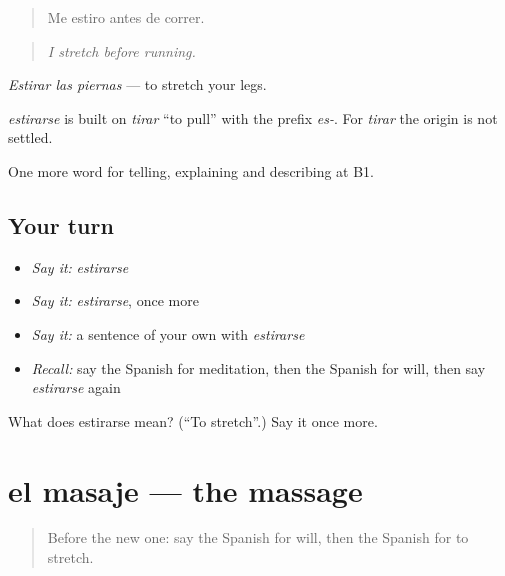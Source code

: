 \begin{quote}
Me estiro antes de correr.
\end{quote}

\begin{quote}
\emph{I stretch before running.}
\end{quote}

\emph{Estirar las piernas} — to stretch your legs.

\begin{cousinweb}
\emph{estirarse} is built on \emph{tirar} \textquotedblleft{}to pull\textquotedblright{} with the prefix \emph{es-}. For \emph{tirar} the origin is not settled.
\end{cousinweb}

\begin{grammarlens}[title={What you've built}]
One more word for telling, explaining and describing at B1.
\end{grammarlens}

\subsection*{Your turn}
\begin{itemize}
\raggedright
  \item \emph{Say it:} \emph{estirarse}
  \item \emph{Say it:} \emph{estirarse}, once more
  \item \emph{Say it:} a sentence of your own with \emph{estirarse}
  \item \emph{Recall:} say the Spanish for meditation, then the Spanish for will, then say \emph{estirarse} again
\end{itemize}

\begin{tcolorbox}[breakable,colback=teal!4,colframe=teal!35!black,title={Before you move on}]
What does estirarse mean? (\textquotedblleft{}To stretch\textquotedblright{}.) Say it once more.
\end{tcolorbox}
\section[el masaje]{el masaje — the massage}

\label{lesson:ES-C767-masaje}



\begin{quote}
Before the new one: say the Spanish for will, then the Spanish for to stretch.
\end{quote}

